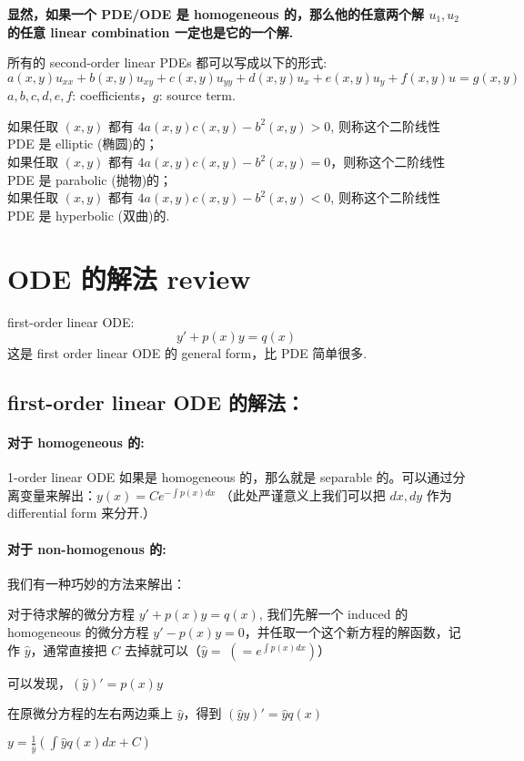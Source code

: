 \documentclass[12pt]{article}
\begin{document}
\proposition 
\textbf{显然，如果一个 PDE/ODE 是 homogeneous 的，那么他的任意两个解 $u_1, u_2$ 的任意 linear combination 一定也是它的一个解.}



\example 
所有的 second-order linear PDEs 都可以写成以下的形式:
$$
a(x,y)u_{xx} + b(x,y)u_{xy} + c(x,y)u_{yy} + d(x,y)u_x + e(x,y)u_y + f(x,y)u = g(x,y)
$$
$a,b,c,d,e,f$:  coefficients，$g$: source term.

\begin{defn}
    如果任取 $(x,y)$ 都有 $4a(x,y)c(x,y) - b^2(x,y) >0$, 则称这个二阶线性 PDE 是 elliptic (椭圆)的；
    \\如果任取 $(x,y)$ 都有 $4a(x,y)c(x,y) - b^2(x,y) =0$，则称这个二阶线性 PDE 是 parabolic (抛物)的；
    \\如果任取 $(x,y)$ 都有 $4a(x,y)c(x,y) - b^2(x,y) <0$, 则称这个二阶线性 PDE 是 hyperbolic (双曲)的.
\end{defn}


\section{ODE 的解法 review}
\begin{defn}
    first-order linear ODE:\\
    $$
    y' + p(x)y = q(x)
    $$
    这是 first order linear ODE 的 general form，比 PDE 简单很多.
\end{defn}

\subsection{first-order linear ODE 的解法：}
\paragraph{对于 homogeneous 的: }
1-order linear ODE 如果是 homogeneous 的，那么就是 separable 的。可以通过分离变量来解出：$y(x) = Ce^{-\int p(x)dx}$ （此处严谨意义上我们可以把 $dx, dy$ 作为 differential form 来分开.）

\paragraph{对于 non-homogenous 的:}
我们有一种巧妙的方法来解出：
\begin{compactenumI}
    \item 对于待求解的微分方程 $y' + p(x)y = q(x)$, 我们先解一个 induced 的 homogeneous  的微分方程 $y' - p(x)y = 0$，并任取一个这个新方程的解函数，记作 $\hat{y}$，通常直接把 $C$ 去掉就可以（$\hat{y} = \; (= e^{\int p(x) dx})$）
    \item 可以发现，$(\hat{y})' = p(x)y$
    \item 在原微分方程的左右两边乘上 $\hat{y}$，得到 $(\hat{y}y)' = \hat{y}q(x)$
    \item $y = \frac{1}{\hat{y}} (\int \hat{y}q(x)dx + C)$
\end{compactenumI}
\end{document}
